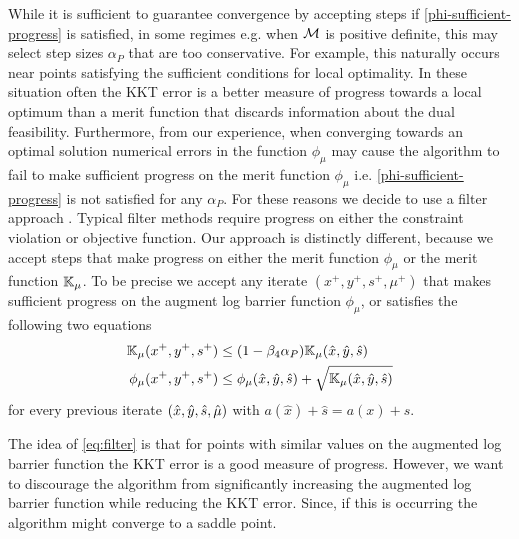 \documentclass{article}
\begin{document}
While it is sufficient to guarantee convergence by accepting steps if \eqref{phi-sufficient-progress} is satisfied, in some regimes e.g. when $\mathcal{M}$ is positive definite, this may select step sizes $\alpha_{P}$ that are too conservative.  For example, this naturally occurs near points satisfying the sufficient conditions for local optimality. In these situation often the KKT error is a better measure of progress towards a local optimum than a merit function that discards information about the dual feasibility. Furthermore, from our experience, when converging towards an optimal solution numerical errors in the function $\phi_{\mu}$ may cause the algorithm to fail to make sufficient progress on the merit function $\phi_{\mu}$ i.e. \eqref{phi-sufficient-progress} is not satisfied for any $\alpha_{P}$. For these reasons we decide to use a filter approach \cite{fletcher2002nonlinear,wachter2006implementation}. Typical filter methods \cite{fletcher2002nonlinear} require progress on either the constraint violation or objective function. Our approach is distinctly different, because we accept steps that make progress on either the merit function $\phi_{\mu}$ or the merit function $\mathbb{K}_{\mu}$.
To be precise we accept any iterate $(x^{+}, y^{+}, s^{+}, \mu^{+})$ that makes sufficient progress on the augment log barrier function $\phi_{\mu}$, or satisfies the following two equations
\begin{subequations}\label{eq:filter}
\begin{flalign}
\meritKKT_{\mu} (x^{+}, y^{+}, s^{+}) &\le (1 - \parKKTReductFactor \alpha_{P} ) \meritKKT_{\mu} (\hat{x}, \hat{y}, \hat{s}) \label{eq:kkt-progress} \\
\phi_{\mu}(x^{+}, y^{+}, s^{+}) &\le \phi_{\mu}(\hat{x}, \hat{y}, \hat{s}) + \sqrt{\meritKKT_{\mu} (\hat{x}, \hat{y}, \hat{s})} %
\end{flalign} %
\end{subequations}
 for every previous iterate $(\hat{x}, \hat{y}, \hat{s}, \hat{\mu})$ with $a(\hat{x}) + \hat{s} = a(x) + s$.

The idea of \eqref{eq:filter} is that for points with similar values on the augmented log barrier function the KKT error is a good measure of progress. However, we want to discourage the algorithm from significantly increasing the augmented log barrier function while reducing the KKT error. Since, if this is occurring the algorithm might converge to a saddle point. 
\end{document}
